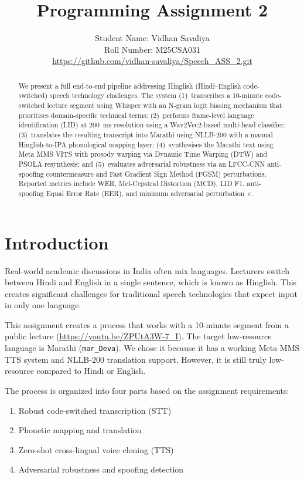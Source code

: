\documentclass[10pt,twocolumn,letterpaper]{article}
\title{%
  \textbf{Programming Assignment 2}\\

}
\author{
  Student Name: Vidhan Savaliya \\
  Roll Number: M25CSA031 \\
  \url{https://github.com/vidhan-savaliya/Speech_ASS_2.git}
}
\date{}
\begin{document}
\maketitle

\begin{abstract}
We present a full end-to-end pipeline addressing Hinglish (Hindi–English code-switched) speech technology challenges. The system (1)~transcribes a 10-minute code-switched lecture segment using Whisper with an N-gram logit biasing mechanism that prioritises domain-specific technical terms; (2)~performs frame-level language identification (LID) at 200~ms resolution using a Wav2Vec2-based multi-head classifier; (3)~translates the resulting transcript into Marathi using NLLB-200 with a manual Hinglish-to-IPA phonological mapping layer; (4)~synthesises the Marathi text using Meta MMS VITS with prosody warping via Dynamic Time Warping (DTW) and PSOLA resynthesis; and (5)~evaluates adversarial robustness via an LFCC-CNN anti-spoofing countermeasure and Fast Gradient Sign Method (FGSM) perturbations. Reported metrics include WER, Mel-Cepstral Distortion (MCD), LID F1, anti-spoofing Equal Error Rate (EER), and minimum adversarial perturbation~$\varepsilon$.
\end{abstract}

\section{Introduction}  
\label{sec:intro}  

Real-world academic discussions in India often mix languages. Lecturers switch between Hindi and English in a single sentence, which is known as Hinglish. This creates significant challenges for traditional speech technologies that expect input in only one language.  

This assignment creates a process that works with a 10-minute segment from a public lecture (\url{https://youtu.be/ZPUtA3W-7_I}). The target low-resource language is Marathi (\texttt{mar\_Deva}). We chose it because it has a working Meta MMS TTS system and NLLB-200 translation support. However, it is still truly low-resource compared to Hindi or English.  

The process is organized into four parts based on the assignment requirements:  
\begin{enumerate}[noitemsep]  
  \item Robust code-switched transcription (STT)  
  \item Phonetic mapping and translation  
  \item Zero-shot cross-lingual voice cloning (TTS)  
  \item Adversarial robustness and spoofing detection  
\end{enumerate}  
\end{document}
